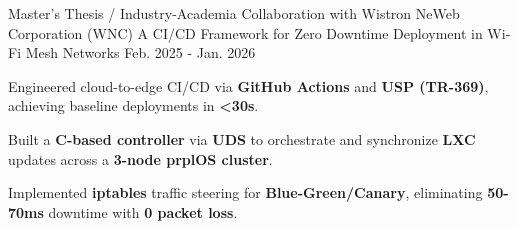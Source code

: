 
\vspace{-0.25cm} %

\begin{cventries}

  \cventry
    {Master's Thesis / Industry-Academia Collaboration with Wistron NeWeb Corporation (WNC)} %
    {A CI/CD Framework for Zero Downtime Deployment in Wi-Fi Mesh Networks} %
    {Feb. 2025 - Jan. 2026} %
    {} %
    {
      \begin{cvitems}
        \item {Engineered cloud-to-edge CI/CD via \textbf{GitHub Actions} and \textbf{USP (TR-369)}, achieving baseline deployments in \textbf{<30s}.}
        \item {Built a \textbf{C-based controller} via \textbf{UDS} to orchestrate and synchronize \textbf{LXC} updates across a \textbf{3-node prplOS cluster}.}
        \item {Implemented \textbf{iptables} traffic steering for \textbf{Blue-Green/Canary}, eliminating \textbf{50-70ms} downtime with \textbf{0 packet loss}.}
      \end{cvitems}
    }

\end{cventries}